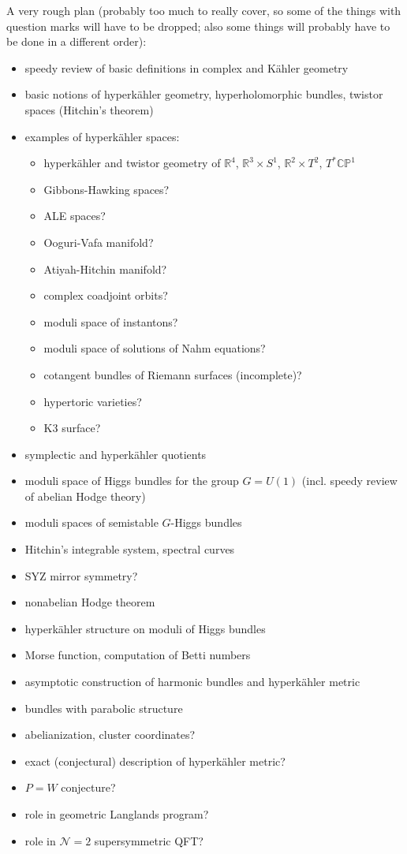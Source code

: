 \documentclass[12pt,letterpaper,reqno]{amsart}
\numberwithin{equation}{section}
\newcommand{\R}{\ensuremath{\mathbb R}}
\newcommand{\C}{\ensuremath{\mathbb C}}
\newcommand{\PP}{\ensuremath{\mathbb P}}
\newcommand{\N}{{\mathcal N}}
\newcommand{\kahler}{K\"ahler\xspace}
\newcommand{\hk}{hyperk\"ahler\xspace}
\begin{document}
A very rough plan (probably too much to really cover,
so some of the things with question marks will have 
to be dropped; also some things will probably 
have to be done in a different order):
\begin{itemize}
  \item speedy review of basic definitions in complex and \kahler geometry
  \item basic notions of \hk geometry, hyperholomorphic bundles, twistor spaces (Hitchin's theorem)
  \item examples of \hk spaces:
  \begin{itemize}
  \item \hk and twistor geometry of $\R^4$, $\R^3 \times S^1$, $\R^2 \times T^2$, $T^* \C\PP^1$
  \item Gibbons-Hawking spaces?
  \item ALE spaces?
  \item Ooguri-Vafa manifold?
  \item Atiyah-Hitchin manifold?
  \item complex coadjoint orbits?
  \item moduli space of instantons?
  \item moduli space of solutions of Nahm equations?
  \item cotangent bundles of Riemann surfaces (incomplete)?
  \item hypertoric varieties?
  \item K3 surface?
  \end{itemize}
  \item symplectic and \hk quotients
  \item moduli space of Higgs bundles for the group $G = U(1)$ (incl. speedy review of abelian Hodge theory)
  \item moduli spaces of semistable $G$-Higgs bundles
  \item Hitchin's integrable system, spectral curves
  \item SYZ mirror symmetry?
  \item nonabelian Hodge theorem
  \item \hk structure on moduli of Higgs bundles
  \item Morse function, computation of Betti numbers
  \item asymptotic construction of harmonic bundles and \hk metric
  \item bundles with parabolic structure
  \item abelianization, cluster coordinates?
  \item exact (conjectural) description of \hk metric?
  \item $P=W$ conjecture?
  \item role in geometric Langlands program?
  \item role in $\N=2$ supersymmetric QFT?
\end{itemize}
\end{document}
